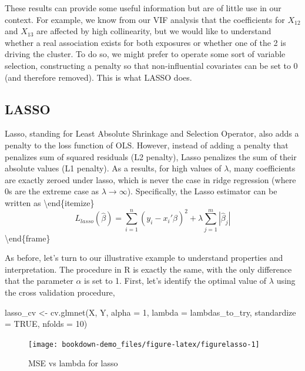 \documentclass[
]{book}
\newenvironment{Shaded}{\begin{snugshade}}{\end{snugshade}}
\newcommand{\AttributeTok}[1]{\textcolor[rgb]{0.77,0.63,0.00}{#1}}
\newcommand{\ConstantTok}[1]{\textcolor[rgb]{0.00,0.00,0.00}{#1}}
\newcommand{\DecValTok}[1]{\textcolor[rgb]{0.00,0.00,0.81}{#1}}
\newcommand{\FunctionTok}[1]{\textcolor[rgb]{0.00,0.00,0.00}{#1}}
\newcommand{\NormalTok}[1]{#1}
\newcommand{\OtherTok}[1]{\textcolor[rgb]{0.56,0.35,0.01}{#1}}
\begin{document}
These results can provide some useful information but are of little use in our context. For example, we know from our VIF analysis that the coefficients for \(X_{12}\) and \(X_{13}\) are affected by high collinearity, but we would like to understand whether a real association exists for both exposures or whether one of the 2 is driving the cluster. To do so, we might prefer to operate some sort of variable selection, constructing a penalty so that non-influential covariates can be set to 0 (and therefore removed). This is what LASSO does.

\hypertarget{lasso}{%
\subsection{LASSO}\label{lasso}}

Lasso, standing for Least Absolute Shrinkage and Selection Operator, also adds a penalty to the loss function of OLS. However, instead of adding a penalty that penalizes sum of squared residuals (L2 penalty), Lasso penalizes the sum of their absolute values (L1 penalty). As a results, for high values of \(\lambda\), many coefficients are exactly zeroed under lasso, which is never the case in ridge regression (where 0s are the extreme case as \(\lambda\rightarrow\infty\)). Specifically, the Lasso estimator can be written as
\textbackslash end\{itemize\}
\[L_{lasso}(\hat{\beta})=\sum_{i=1}^n(y_i-x_i'\hat{\beta})^2+\lambda\sum_{j=1}^m|\hat{\beta}_j|\]
\textbackslash end\{frame\}

As before, let's turn to our illustrative example to understand properties and interpretation. The procedure in R is exactly the same, with the only difference that the parameter \(\alpha\) is set to 1. First, let's identify the optimal value of \(\lambda\) using the cross validation procedure,

\begin{Shaded}
\begin{Highlighting}[]
\NormalTok{lasso\_cv }\OtherTok{\textless{}{-}} \FunctionTok{cv.glmnet}\NormalTok{(X, Y, }\AttributeTok{alpha =} \DecValTok{1}\NormalTok{, }\AttributeTok{lambda =}\NormalTok{ lambdas\_to\_try,}
                      \AttributeTok{standardize =} \ConstantTok{TRUE}\NormalTok{, }\AttributeTok{nfolds =} \DecValTok{10}\NormalTok{)}
\end{Highlighting}
\end{Shaded}

\begin{figure}[H]

{\centering \texttt{[image: bookdown-demo\_files/figure-latex/figurelasso-1]} 

}

\caption{MSE vs lambda for lasso}\label{fig:figurelasso}
\end{figure}
\end{document}
